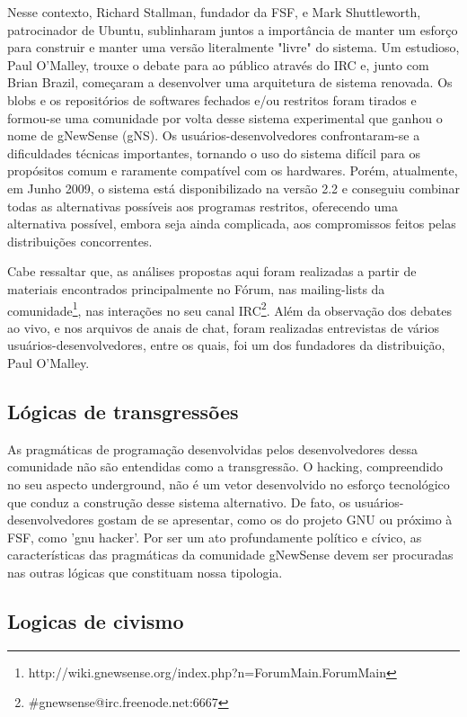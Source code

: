 Nesse contexto, Richard Stallman, fundador da FSF, e Mark Shuttleworth, patrocinador de Ubuntu, sublinharam juntos a importância de manter um esforço para construir e manter uma versão literalmente "livre" do sistema. Um estudioso, Paul O'Malley, trouxe o debate para ao público através do IRC e, junto com Brian Brazil, começaram a desenvolver uma arquitetura de sistema renovada. Os blobs e os repositórios de softwares fechados e/ou restritos foram tirados e formou-se uma comunidade por volta desse sistema experimental que ganhou o nome de gNewSense (gNS). Os usuários-desenvolvedores confrontaram-se a dificuldades técnicas importantes, tornando o uso do sistema difícil para os propósitos comum e raramente compatível com os hardwares. Porém, atualmente, em Junho 2009, o sistema está disponibilizado na versão 2.2 e conseguiu combinar todas as alternativas possíveis aos programas restritos, oferecendo uma alternativa possível, embora seja ainda complicada, aos compromissos feitos pelas distribuições concorrentes.

Cabe ressaltar que, as análises propostas aqui foram realizadas a partir de materiais encontrados principalmente no Fórum, nas mailing-lists da comunidade\footnote{http://wiki.gnewsense.org/index.php?n=ForumMain.ForumMain}, nas interações no seu canal IRC\footnote{\#gnewsense@irc.freenode.net:6667}. Além da observação dos debates ao vivo, e nos arquivos de anais de chat, foram realizadas entrevistas de vários usuários-desenvolvedores, entre os quais, foi um dos fundadores da distribuição, Paul O'Malley.

\subsection{Lógicas de transgressões} \label{3.2.1}

As pragmáticas de programação desenvolvidas pelos desenvolvedores dessa comunidade não são entendidas como a transgressão. O hacking, compreendido no seu aspecto underground, não é um vetor desenvolvido no esforço tecnológico que conduz a construção desse sistema alternativo. De fato, os usuários-desenvolvedores gostam de se apresentar, como os do projeto GNU ou próximo à FSF, como 'gnu hacker'. Por ser um ato profundamente político e cívico, as características das pragmáticas da comunidade gNewSense devem ser procuradas nas outras lógicas que constituam nossa tipologia.

\subsection{Logicas de civismo} \label{3.2.2}

